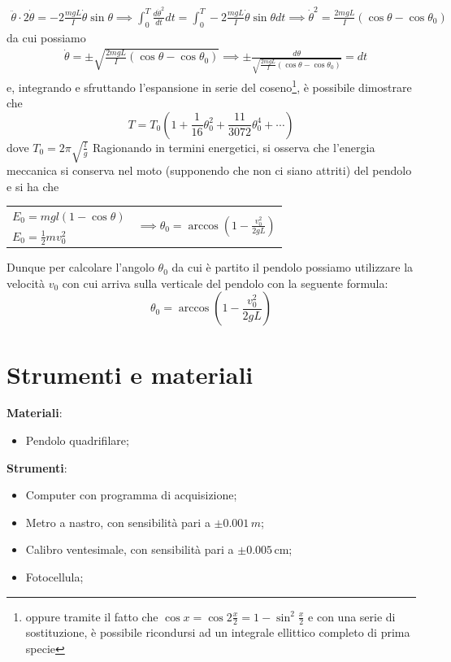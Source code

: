\documentclass{article}
\begin{document}
	\begin{align*}
		\ddot{\theta} \cdot 2 \dot{\theta} = -2\frac{mgL}{I}\dot{\theta}\sin{\theta} \implies \int_0^T \frac{d\dot{\theta}^2}{dt} dt = \int_0^T -2\frac{mgL}{I}\dot{\theta}\sin{\theta} dt \implies \dot{\theta}^2 = \frac{2mgL}{I}(\cos{\theta} - \cos{\theta_0})
	\end{align*}
	da cui possiamo 
	\begin{align*}
		&\dot{\theta} = \pm \sqrt{\frac{2mgL}{I}(\cos{\theta} - \cos{\theta_0})} \implies \pm \frac{d\theta}{\sqrt{\frac{2mgL}{I}(\cos{\theta} - \cos{\theta_0})} } = dt
	\end{align*}
	e, integrando e sfruttando l'espansione in serie del coseno\footnote{oppure tramite il fatto che $\cos{x} = \cos{2\frac{x}{2}} = 1 - \sin^2{\frac{x}{2}}$ e con una serie di sostituzione, è possibile ricondursi ad un integrale ellittico completo di prima specie}, è possibile dimostrare che
	\begin{equation}
		T = T_0 \left( 1 + \frac{1}{16}\theta_0^2 + \frac{11}{3072}\theta_0^4 + \cdots \right)
	\end{equation}
	dove $T_0 = 2\pi\sqrt{\frac{l}{g}}$
	Ragionando in termini energetici, si osserva che l'energia meccanica si conserva nel moto (supponendo che non ci siano attriti) del pendolo e si ha che

\begin{table}[H]
    \centering
    \begin{tabular}{l c}
        $E_0 = mgl(1-\cos{\theta})$ & \multirow{2}{*}{$\implies \theta_0 = \arccos{ \left(1 - \frac{v_0^2}{2gL} \right)}$} \\
         $E_0 = \frac{1}{2}mv_0^2$ &  \\
    \end{tabular}
\end{table}

\noindent Dunque per calcolare l'angolo $\theta_0$ da cui è partito il pendolo possiamo utilizzare la velocità $v_0$ con cui arriva sulla verticale del pendolo con la seguente formula:
\begin{equation}
	\theta_0 = \arccos{\left(1- \frac{v_0^2}{2gL} \right) }
	\label{angolo}
\end{equation}
	\section{Strumenti e materiali}
	\textbf{Materiali}:
	\begin{itemize}
		\item Pendolo quadrifilare;
	\end{itemize}
	\textbf{Strumenti}:
	\begin{itemize}
		\item Computer con programma di acquisizione;
		\item Metro a nastro, con sensibilità pari a $\pm 0.001 \, \si{m}$;
		\item Calibro ventesimale, con sensibilità pari a $\pm 0.005 \, \si{\centi\meter}$;
		\item Fotocellula;
	\end{itemize}
\end{document}
